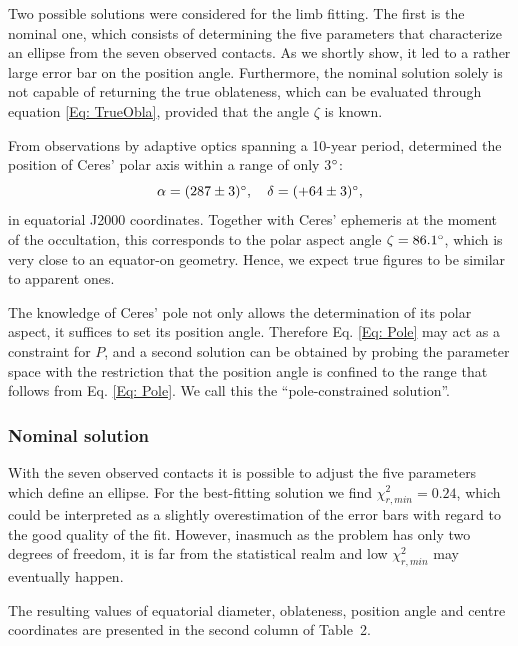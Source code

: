\documentclass[useAMS,usenatbib]{mn2e}
\begin{document}
Two possible solutions were considered for the limb fitting. The first is the nominal one, which consists of determining the five parameters that characterize an ellipse from the seven observed contacts. As we shortly show, it led to a rather large error bar on the position angle. Furthermore, the nominal solution solely is not capable of returning the true oblateness, which can be evaluated through equation \ref{Eq: TrueObla}, provided that the angle $\zeta$ is known.%

From observations by adaptive optics spanning a 10-year period, \cite{Drummond2014} determined the position of Ceres' polar axis within a range of only 3$\hbox{$^\circ$}$:
\begin{equation}
\alpha = (287 \pm 3) \degr, \quad %
\delta = (+64 \pm 3) \degr,
\label{Eq: Pole}
\end{equation}
%
in equatorial J2000 coordinates. Together with Ceres' ephemeris at the moment of the occultation, this corresponds to the polar aspect angle $\zeta = 86.1\hbox{$^\circ$}$, which is very close to an equator-on geometry. Hence, we expect true figures to be similar to apparent ones.

The knowledge of Ceres' pole not only allows the determination of its polar aspect, it suffices to set its position angle. Therefore Eq. \ref{Eq: Pole} may act as a constraint for $P$, and a second solution can be obtained by probing the parameter space with the restriction that the position angle is confined to the range that follows from Eq. \ref{Eq: Pole}. We call this the ``pole-constrained solution''.


\subsubsection{Nominal solution}

With the seven observed contacts it is possible to adjust the five parameters which define an ellipse. For the best-fitting solution we find $\chi^2_{r,min} = 0.24$, which could be interpreted as a slightly overestimation of the error bars with regard to the good quality of the fit. However, inasmuch as the problem has only two degrees of freedom, it is far from the statistical realm and low $\chi^2_{r,min}$ may eventually happen.

The resulting values of equatorial diameter, oblateness, position angle and centre coordinates are presented in the second column of Table~2.%
\end{document}
